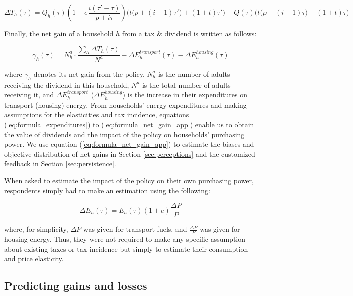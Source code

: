 \documentclass[12pt]{article} %
\begin{document}
\begin{appendices}
\begin{equation}
\label{eq:formula_dividend}
    \Delta T_h\left(\tau\right) = Q_h\left(\tau\right) \left( 1 + e \frac{i\left(\tau' - \tau\right)}{p + i \tau} \right) \bigg( t \big(p + \left(i-1\right)\tau' \big) + \left(1+t\right) \tau' \bigg) - Q\left(\tau\right) \bigg( t \big(p + \left(i-1\right)\tau \big) + \left(1+t\right) \tau \bigg)
\end{equation}

\noindent
Finally, the net gain of a household $h$ from a tax \& dividend is written as follows:

\begin{equation}
\label{eq:formula_net_gain_app}
    \gamma_h(\tau) = N^a_h \cdot \frac{\sum_h \Delta T_h(\tau)}{N^a} - \Delta E_h^{transport}(\tau) - \Delta E_h^{housing}(\tau)
\end{equation}

\noindent
where $\gamma_h$ denotes its net gain from the policy, $N^a_h$ is the number of adults receiving the dividend in this household, $N^a$ is the total number of adults receiving it, and $\Delta E_h^{transport}$ ($\Delta E_h^{housing}$) is the increase in their expenditures on transport (housing) energy. From households' energy expenditures and making assumptions for the elasticities and tax incidence, equations (\ref{eq:formula_expenditures}) to (\ref{eq:formula_net_gain_app}) enable us to obtain the value of dividends and the impact of the policy on households' purchasing power. We use equation (\ref{eq:formula_net_gain_app}) to estimate the biases and objective distribution of net gains in Section \ref{sec:perceptions} and the customized feedback in Section \ref{sec:persistence}.

When asked to estimate the impact of the policy on their own purchasing power, respondents simply had to make an estimation using the following:

$$
\Delta E_h\left(\tau\right) = E_h\left(\tau\right)\left(1+e\right) \frac{\Delta P}{P}
$$

\noindent
where, for simplicity, $\Delta P$ was given for transport fuels, and $\frac{\Delta P}{P}$ was given for housing energy. Thus, they were not required to make any specific assumption about existing taxes or tax incidence but simply to estimate their consumption and price elasticity.

\subsection{Predicting gains and losses\label{appendix:estimation_feedback_regression}}


\end{appendices}
\end{document}
